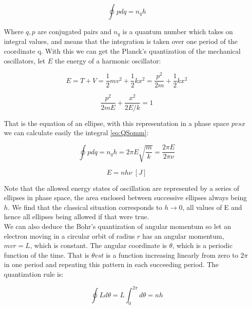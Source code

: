 \documentclass[spanish,notitlepage,letterpaper,11pt]{article} %
\numberwithin{equation}{subsection}
\begin{document}
        \begin{equation}\label{eq:QSomm}
            \oint pdq = n_qh
        \end{equation}

        Where ${q,p}$ are conjugated pairs and $n_q$ is a quantum number which takes on integral values, and means that the integration is taken over one period of the coordinate q. With this we can get the Planck's quantization of the mechanical oscillators, let $E$ the energy of a harmonic oscillator:

        \begin{equation*}
            E = T + V = \frac{1}{2}mv^2 + \frac{1}{2}kx^2 = \frac{p^2}{2m} + \frac{1}{2}kx^2
        \end{equation*}

        \begin{equation}
            \frac{p^2}{2mE} + \frac{x^2}{2E/k} = 1
        \end{equation}

        That is the equation of an ellipse, with this representation in a phase space $p vs x$ we can calculate easily the integral \ref{eq:QSomm}:

        \begin{equation*}
            \oint pdq = n_qh = 2\pi E \sqrt{\frac{m}{k}} = \frac{2\pi E}{2\pi \nu}
        \end{equation*}

        \begin{equation}
            E = nh\nu \;[J]
        \end{equation}

        Note that the allowed energy states of oscillation are represented by a series of ellipses in phase space, the area enclosed between successive ellipses always being $h$. We find that the classical situation corresponds to $h \rightarrow 0$, all values of E and hence all ellipses being allowed if that were true.\\

        We can also deduce the Bohr's quantization of angular momentum so let an electron moving in a circular orbit of radius $r$ has an angular momentum, $mvr = L$, which is constant. The angular coordinate is $\theta$, which is a periodic function of the time. That is $\theta vs t$ is a function increasing linearly from zero to $2\pi$ in one period and repeating this pattern in each succeeding period. The quantization rule is:

        \begin{equation}
            \oint L d\theta = L \int_0^{2\pi}d\theta = nh 
        \end{equation}
\end{document}
